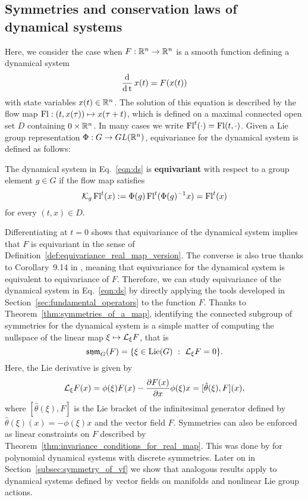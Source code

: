 \documentclass[twoside,11pt]{article}
\begin{document}
\subsection{Symmetries and conservation laws of dynamical systems}
\label{subsec:dynamical_systems}
Here, we consider the case when $F:\mathbb{R}^n \to \mathbb{R}^n$ is a smooth function defining a dynamical system
\begin{equation}
    \operatorname{\frac{\operatorname{\mathrm{d}}}{\operatorname{\mathrm{d}} t}} x(t) = F(x(t))
    \label{eqn:ds}
\end{equation}
with state variables $x(t)\in\mathbb{R}^n$.
The solution of this equation is described by the flow map $\operatorname{Fl}: (t, x(\tau)) \mapsto x(\tau + t)$, which is defined on a maximal connected open set $D$ containing $0\times\mathbb{R}^n$.
In many cases we write $\operatorname{Fl}^t(\cdot) = \operatorname{Fl}(t, \cdot)$.
Given a Lie group representation $\Phi: G \to GL(\mathbb{R}^n)$, equivariance for the dynamical system is defined as follows:
\begin{definition}
    The dynamical system in Eq.~\ref{eqn:ds} is \textbf{equivariant} with respect to a group element $g\in G$ if the flow map satisfies
    \begin{equation}
        {\mathcal{K}}_g \operatorname{Fl}^t (x) := \Phi(g) \operatorname{Fl}^t(\Phi(g)^{-1} x) = \operatorname{Fl}^t(x)
    \end{equation}
    for every $(t,x) \in D$.
\end{definition}
Differentiating at $t=0$ shows that equivariance of the dynamical system implies that $F$ is equivariant in the sense of Definition~\ref{def:equivariance_real_map_version}.
The converse is also true thanks to Corollary~9.14 in \cite{Lee2013introduction}, meaning that equivariance for the dynamical system is equivalent to equivariance of $F$.
Therefore, we can study equivariance of the dynamical system in Eq.~\ref{eqn:ds} by directly applying the tools developed in Section~\ref{sec:fundamental_operators} to the function $F$.
Thanks to Theorem~\ref{thm:symmetries_of_a_map}, identifying the connected subgroup of symmetries for the dynamical system is a simple matter of computing the nullspace of the linear map $\xi \mapsto {\mathcal{L}}_{\xi} F$, that is
\begin{equation}
    \sym_G(F) = \{ \xi \in \Lie(G) \ : \ \mcal{L}_{\xi} F = 0 \}.
\end{equation}
Here, the Lie derivative is given by 
\begin{equation}
    {\mathcal{L}}_{\xi} F(x) 
    = \phi(\xi) F(x) - \frac{\partial F(x)}{\partial x} \phi(\xi) x
    = [\hat{\theta}(\xi), F](x),
\end{equation}
where $[\hat{\theta}(\xi), F]$ is the Lie bracket of the infinitesimal generator defined by $\hat{\theta}(\xi)(x) = -\phi(\xi) x$ and the vector field $F$.
Symmetries can also be enforced as linear constraints on $F$ described by Theorem~\ref{thm:invariance_conditions_for_real_map}.
This was done by \cite{Ahmadi2020learning_short} for polynomial dynamical systems with discrete symmetries.
Later on in Section~\ref{subsec:symmetry_of_vf} we show that analogous results apply to dynamical systems defined by vector fields on manifolds and nonlinear Lie group actions.
\end{document}
